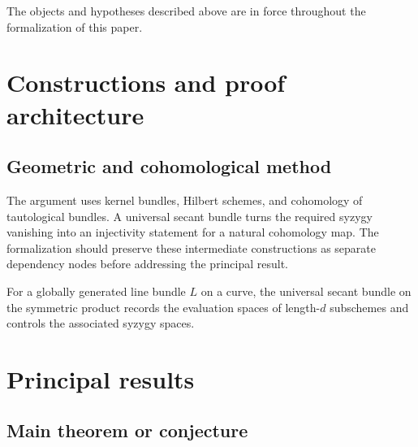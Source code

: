 \begin{convention}
\label{universal-secant-bundles-syzygies-canonical-curves-setup}
The objects and hypotheses described above are in force throughout the
formalization of this paper.
\notready
\end{convention}

\chapter{Constructions and proof architecture}
\label{chap:universal-secant-bundles-syzygies-canonical-curves-method}

\section{Geometric and cohomological method}
\label{sec:universal-secant-bundles-syzygies-canonical-curves-method}

The argument uses kernel bundles, Hilbert schemes, and cohomology of tautological bundles. A universal secant bundle turns the required syzygy vanishing into an injectivity statement for a natural cohomology map. The formalization should preserve these intermediate constructions
as separate dependency nodes before addressing the principal result.

\begin{definition}
\label{universal-secant-bundles-syzygies-canonical-curves-central-object}
For a globally generated line bundle $L$ on a curve, the universal secant bundle on the symmetric product records the evaluation spaces of length-$d$ subschemes and controls the associated syzygy spaces.
\notready
\end{definition}

\chapter{Principal results}
\label{chap:universal-secant-bundles-syzygies-canonical-curves-results}

\section{Main theorem or conjecture}
\label{sec:universal-secant-bundles-syzygies-canonical-curves-results}

